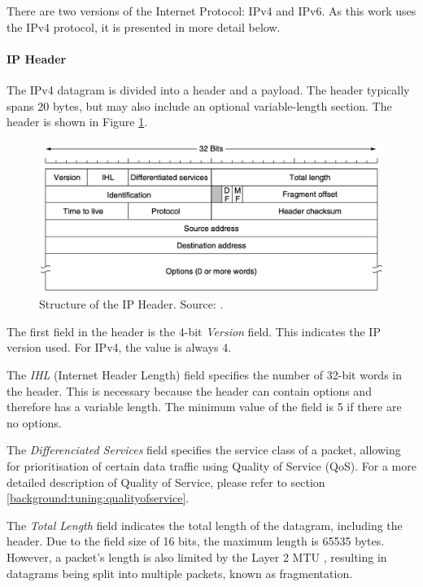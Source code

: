 There are two versions of the Internet Protocol: IPv4 and IPv6. As this work uses the IPv4 protocol, it is presented in more detail below.

\paragraph{IP Header}

The IPv4 datagram is divided into a header and a payload. The header typically spans 20 bytes, but may also include an optional variable-length section. The header is shown in Figure \ref{fig:IPHeader}.

\begin{figure}[h]
    \centering
    \includegraphics[width=1\linewidth]{figures/tcpip_refmodel/image7.png}
    \caption[Structure of the IP Header]{Structure of the IP Header. Source: \cite{Tanenbaum2010}.}
    \label{fig:IPHeader}
\end{figure}

The first field in the header is the 4-bit \textit{Version} field. This indicates the IP version used. For IPv4, the value is always 4.

The \textit{IHL} (Internet Header Length) field specifies the number of 32-bit words in the header. This is necessary because the header can contain options and therefore has a variable length. The minimum value of the field is 5 if there are no options.

The \textit{Differenciated Services} field specifies the service class of a packet, allowing for prioritisation of certain data traffic using Quality of Service (QoS). For a more detailed description of Quality of Service, please refer to section \ref{background:tuning:qualityofservice}.

The \textit{Total Length} field indicates the total length of the datagram, including the header. Due to the field size of 16 bits, the maximum length is 65535 bytes. However, a packet's length is also limited by the Layer 2 MTU \cite{Weigel2021}, resulting in datagrams being split into multiple packets, known as fragmentation. 


